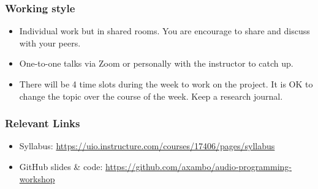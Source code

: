 \documentclass[screen, aspectratio=43]{beamer}
\begin{document}
%
\begin{frame}
\frametitle{Working style}
\begin{itemize}
\item Individual work but in shared rooms. You are encourage to share and discuss with your peers.
\item One-to-one talks via Zoom or personally with the instructor to catch up.
\item There will be 4 time slots during the week to work on the project. It is OK to change the topic over the course of the week. Keep a research journal.
\end{itemize}
\end{frame}
%
\begin{frame}
\frametitle{Relevant Links}
\begin{itemize}
\item Syllabus: \url{https://uio.instructure.com/courses/17406/pages/syllabus}
\item GitHub slides \& code: \url{https://github.com/axambo/audio-programming-workshop}
\end{itemize}
\end{frame}
%
%
\end{document}
